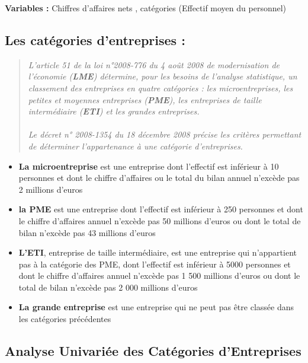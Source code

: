 \documentclass[mstat,12pt]{unswthesis}
\begin{document}
\bigskip

\textbf{Variables :} Chiffres d'affaires nets , catégories (Effectif
moyen du personnel)

\subsection{Les catégories d'entreprises
:}\label{les-catuxe9gories-dentreprises}

\bigskip
\scriptsize
\begin{quote}
\textit{L’article 51 de la loi n°2008-776 du 4 août 2008 de modernisation de l’économie (\textbf{LME}) détermine, pour les besoins de l’analyse statistique, un classement des entreprises en quatre catégories : les microentreprises, les petites et moyennes entreprises (\textbf{PME}), les entreprises de taille intermédiaire (\textbf{ETI}) et les grandes entreprises.\\ \\Le décret n° 2008-1354 du 18 décembre 2008 précise les critères permettant de déterminer l’appartenance à une catégorie d'entreprises.}
\end{quote}
\normalsize

\begin{itemize}[label=$\circ$]
  \item \textnormal{ \textbf{La microentreprise} est une entreprise dont l'effectif est inférieur à 10 personnes et dont le chiffre d'affaires ou le total du bilan annuel n'excède pas 2 millions d'euros}
\item \textnormal{ \textbf{la PME} est une entreprise dont l’effectif est inférieur à 250 personnes
et dont le chiffre d’affaires annuel n'excède pas 50 millions d'euros ou
dont le total de bilan n'excède pas 43 millions d'euros }
\item \textnormal{\textbf{L'ETI}, entreprise de taille intermédiaire, est une entreprise qui n'appartient pas à la catégorie des PME, dont l’effectif est inférieur à 5000 personnes et dont le chiffre d'affaires annuel n'excède pas 1 500 millions d'euros ou dont le total de bilan n'excède pas 2 000 millions d'euros}
\item \textnormal{\textbf{La grande entreprise} est une entreprise qui ne peut pas être classée
dans les catégories précédentes}
\end{itemize}

\newpage

\subsection{Analyse Univariée des Catégories
d'Entreprises}\label{analyse-univariuxe9e-des-catuxe9gories-dentreprises}
\end{document}
